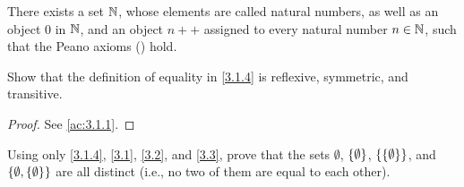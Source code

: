 \begin{ax}[Infinity]\label{3.7}
  There exists a set \(\mathbb{N}\), whose elements are called natural numbers, as well as an object \(0\) in \(\mathbb{N}\), and an object \(n++\) assigned to every natural number \(n \in \mathbb{N}\), such that the Peano axioms () hold.
\end{ax}

\exercisesection

\begin{ex}\label{ex:3.1.1}
  Show that the definition of equality in \cref{3.1.4} is reflexive, symmetric, and transitive.
\end{ex}

\begin{proof}
  See \cref{ac:3.1.1}.
\end{proof}

\begin{ex}\label{ex:3.1.2}
  Using only \cref{3.1.4}, \cref{3.1}, \cref{3.2}, and \cref{3.3}, prove that the sets \(\emptyset\), \(\left\lbrace\emptyset\right\rbrace\), \(\left\lbrace\left\lbrace\emptyset\right\rbrace\right\rbrace\), and \(\left\lbrace\emptyset, \left\lbrace\emptyset\right\rbrace\right\rbrace\) are all distinct
  (i.e., no two of them are equal to each other).
\end{ex}


